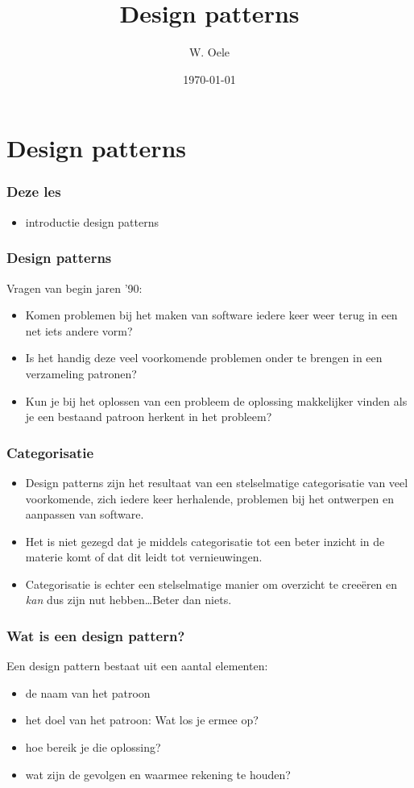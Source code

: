 \documentclass{beamer}
\title{Design patterns}
\author{W. Oele}
\date{\today}
\begin{document}
\frame{\titlepage}

\section{Design patterns}

\begin{frame}
\frametitle{Deze les}
\begin{itemize}
\item introductie design patterns
\end{itemize}

\end{frame}


\begin{frame}
\frametitle{Design patterns}
Vragen van begin jaren '90:
\begin{itemize}
\item Komen problemen bij het maken van software iedere keer weer terug in een net iets andere vorm?
\item Is het handig deze veel voorkomende problemen onder te brengen in een verzameling patronen?
\item Kun je bij het oplossen van een probleem de oplossing makkelijker vinden als je een bestaand patroon herkent in het probleem?
\end{itemize}
\end{frame}

\begin{frame} \frametitle{Categorisatie}

\begin{itemize}
 \item  Design patterns zijn het resultaat van een stelselmatige categorisatie van veel voorkomende, zich iedere keer herhalende, problemen bij het ontwerpen en aanpassen van software.\pause
 \item Het is niet gezegd dat je middels categorisatie tot een beter inzicht in de materie komt of dat dit leidt tot vernieuwingen.\pause
 \item Categorisatie is echter een stelselmatige manier om overzicht te cree\"eren en \emph{kan} dus zijn nut hebben\ldots Beter dan niets. \pause
\end{itemize}
\end{frame}

\begin{frame} \frametitle{Wat is een design pattern?}
  Een design pattern bestaat uit een aantal elementen:
  \begin{itemize}
  \item de naam van het patroon
  \item het doel van het patroon: Wat los je ermee op?
  \item hoe bereik je die oplossing?
  \item wat zijn de gevolgen en waarmee rekening te houden?
  \end{itemize}
\end{frame}
\end{document}
